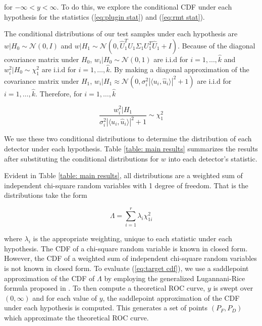 for $-\infty<y<\infty$. To do this, we explore the conditional CDF under each hypothesis for the statistics (\ref{eq:plugin stat}) and (\ref{eq:rmt stat}).

The conditional distributions of our test samples under each hypothesis are $w|H_0\sim\mathcal{N}(0,I)$ and $w|H_1\sim\mathcal{N}(0,\widehat{U}^T_1U_1\Sigma_1U_1^T\widehat{U}_1+I)$. Because of the diagonal covariance matrix under $H_0$, $w_i|H_0\sim\mathcal{N}(0,1)$ are i.i.d for $i=1,\dots,\widehat{k}$ and $w_i^2|H_0\sim\chi_1^2$ are i.i.d for $i=1,\dots,\widehat{k}$. By making a diagonal approximation of the  covariance matrix under $H_1$,  $w_i|H_1\approx\mathcal{N}(0,\sigma^2_i|\langle u_i,\widehat{u}_i\rangle|^2+1)$ are i.i.d for $i=1,\dots,\widehat{k}$. Therefore, for $i=1,\dots,\widehat{k}$

\begin{equation*}
\frac{w_i^2|H_1}{\sigma^2_i|\langle u_i,\widehat{u}_i\rangle|^2+1}\sim\chi_1^2
\end{equation*}

We use these two conditional distributions to determine the distribution of each detector under each hypothesis. Table \ref{table: main results} summarizes the results after substituting the conditional distributions for $w$ into each detector's statistic.

Evident in Table \ref{table: main results}, all distributions are a weighted sum of independent chi-square random variables with 1 degree of freedom. That is the distributions take the form

\begin{equation*}
\Lambda = \sum_{i=1}^r\lambda_i\chi^2_{1i}
\end{equation*}

where $\lambda_i$ is the appropriate weighting, unique to each statistic under each hypothesis. The CDF of a chi-square random variable is known in closed form. However, the CDF of a weighted sum of independent chi-square random variables is not known in closed form. To evaluate (\ref{eq:target cdf}), we use a saddlepoint approximation of the CDF of $\Lambda$ by employing the generalized Lugannani-Rice formula proposed in \cite{wood1993saddlepoint}. To then compute a theoretical ROC curve, $y$ is swept over $(0,\infty)$ and for each value of $y$, the saddlepoint approximation of the CDF under each hypothesis is computed. This generates a set of points $(P_F,P_D)$ which approximate the theoretical ROC curve.

